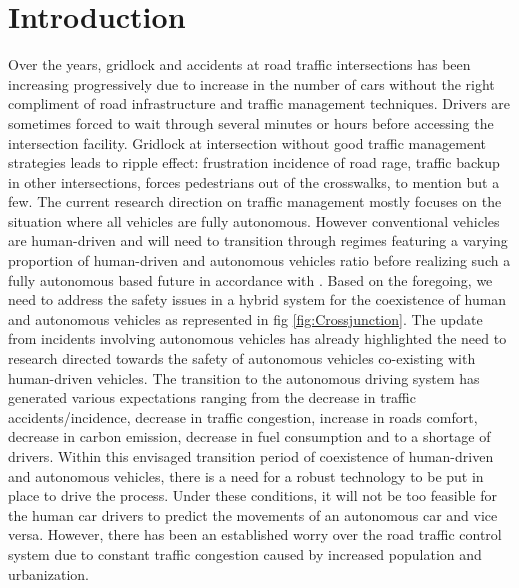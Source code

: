 \documentclass{book}
\begin{document}



\chapter{Introduction}

\label{Introduction}
Over the years, gridlock and accidents at road traffic intersections  has been increasing progressively due to increase in the number of cars without the right compliment of road infrastructure and traffic management techniques. Drivers are sometimes forced to wait through several minutes or hours before accessing the intersection facility. Gridlock at intersection   without good traffic management strategies leads to ripple effect: frustration incidence of road rage, traffic backup in other intersections, forces pedestrians out of the crosswalks, to mention but a few.
The current research direction on traffic management mostly focuses on the situation where all vehicles are fully autonomous. However conventional vehicles are human-driven and will need to transition through regimes featuring a varying proportion of human-driven and autonomous vehicles ratio before realizing such a fully autonomous based future in accordance with \cite{kuramoto2018mono, seshia2016towards}. Based on the foregoing, we need to address the safety issues in a hybrid system for the coexistence of human and autonomous vehicles as represented in fig \ref{fig:Crossjunction}. The update from  incidents involving autonomous vehicles has already highlighted the need to research directed towards the safety of autonomous vehicles co-existing with human-driven vehicles\cite{le2015autonomous, wang2015longitudinal,liu2018safe, lu2004automated, ma2017parsimonious, zhao2019bilevel, lin2019autonomous, rios2017survey, van2001prototype, huang2017safety}.
The transition to the autonomous driving system has generated various expectations ranging from the decrease in traffic accidents/incidence, decrease in traffic congestion, increase in roads comfort, decrease in carbon emission, decrease in fuel consumption  and to a shortage of drivers. Within this envisaged transition period of coexistence of human-driven and autonomous vehicles, there is a need for a robust technology to be put in place to drive the process. Under these conditions, it will not be too feasible for the human car drivers to predict the movements of an autonomous car and vice versa. However, there has been an established worry over the road traffic control system due to constant traffic congestion caused by increased population and urbanization.\\
\end{document}
